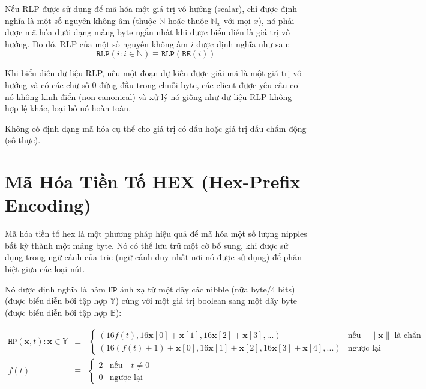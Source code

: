\documentclass[9pt,oneside]{amsart}
\makeatletter
\newcommand{\linkdest}[1]{\Hy@raisedlink{\hypertarget{#1}{}}}
\makeatother
\begin{document}
Nếu RLP được sử dụng để mã hóa một giá trị vô hướng (scalar), chỉ được định nghĩa là một số nguyên không âm (thuộc $\mathbb{N}$ hoặc thuộc $\mathbb{N}_x$ với mọi $x$), nó phải được mã hóa dưới dạng mảng byte ngắn nhất khi được biểu diễn là giá trị vô hướng. Do đó, RLP của một số nguyên không âm $i$ được định nghĩa như sau:
\begin{equation}
\mathtt{RLP}(i : i \in \mathbb{N}) \equiv \mathtt{RLP}(\mathtt{BE}(i))
\end{equation}

Khi biểu diễn dữ liệu RLP, nếu một đoạn dự kiến được giải mã là một giá trị vô hướng và có các chữ số 0 đứng đầu trong chuỗi byte, các client được yêu cầu coi nó không kinh điển (non-canonical) và xử lý nó giống như dữ liệu RLP không hợp lệ khác, loại bỏ nó hoàn toàn.

Không có định dạng mã hóa cụ thể cho giá trị có dấu hoặc giá trị dấu chấm động (số thực).

\section{Mã Hóa Tiền Tố HEX (Hex-Prefix Encoding)}\label{app:hexprefix}
Mã hóa tiền tố hex là một phương pháp hiệu quả để mã hóa một số lượng nipples bất kỳ thành một mảng byte. Nó có thể lưu trữ một cờ bổ sung, khi được sử dụng trong ngữ cảnh của trie (ngữ cảnh duy nhất nơi nó được sử dụng) để phân biệt giữa các loại nút.

Nó được định nghĩa là hàm $\mathtt{HP}$ ánh xạ từ một dãy các nibble (nữa byte/4 bits) (được biểu diễn bởi tập hợp \linkdest{set_of_sequence_of_nibbles}$\mathbb{Y}$) cùng với một giá trị boolean sang một dãy byte (được biểu diễn bởi tập hợp $\mathbb{B}$):

\begin{eqnarray}
\mathtt{HP}(\mathbf{x}, t): \mathbf{x} \in \mathbb{Y} & \equiv & \begin{cases}
(16f(t), 16\mathbf{x}[0] + \mathbf{x}[1], 16\mathbf{x}[2] + \mathbf{x}[3], ...) &
\text{nếu} \quad \lVert \mathbf{x} \rVert \; \text{là chẵn} \\
(16(f(t) + 1) + \mathbf{x}[0], 16\mathbf{x}[1] + \mathbf{x}[2], 16\mathbf{x}[3] + \mathbf{x}[4], ...) &
\text{ngược lại}
\end{cases} \\
f(t) & \equiv & \begin{cases} 2 & \text{nếu} \quad t \neq 0 \\ 0 & \text{ngược lại} \end{cases}
\end{eqnarray}
\end{document}
